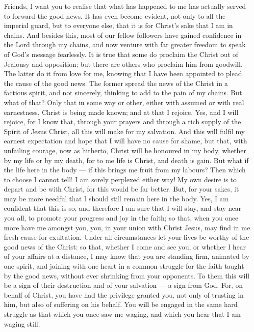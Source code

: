  Friends, I want you to realise that what has happened to
me has actually served to forward the good news.  It has
even become evident, not only to all the imperial guard, but to everyone
else, that it is for Christ's sake that I am in chains. 
And besides this, most of our fellow followers have gained confidence in
the Lord through my chains, and now venture with far greater freedom to
speak of God's message fearlessly.  It is true that some do
proclaim the Christ out of Jealousy and opposition; but there are others
who proclaim him from goodwill.  The latter do it from love
for me, knowing that I have been appointed to plead the cause of the
good news.  The former spread the news of the Christ in a
factious spirit, and not sincerely, thinking to add to the pain of my
chains.  But what of that? Only that in some way or other,
either with assumed or with real earnestness, Christ is being made
known; and at that I rejoice.  Yes, and I will rejoice, for
I know that, through your prayers and through a rich supply of the
Spirit of Jesus Christ, all this will make for my salvation.
 And this will fulfil my earnest expectation and hope that
I will have no cause for shame, but that, with unfailing courage, now as
hitherto, Christ will be honoured in my body, whether by my life or by
my death,  for to me life is Christ, and death is gain.
 But what if the life here in the body --- if this brings
me fruit from my labours? Then which to choose I cannot tell! I am
sorely perplexed either way!  My own desire is to depart
and be with Christ, for this would be far better.  But, for
your sakes, it may be more needful that I should still remain here in
the body.  Yes, I am confident that this is so, and
therefore I am sure that I will stay, and stay near you all, to promote
your progress and joy in the faith;  so that, when you once
more have me amongst you, you, in your union with Christ Jesus, may find
in me fresh cause for exultation.  Under all circumstances
let your lives be worthy of the good news of the Christ: so that,
whether I come and see you, or whether I hear of your affairs at a
distance, I may know that you are standing firm, animated by one spirit,
and joining with one heart in a common struggle for the faith taught by
the good news,  without ever shrinking from your opponents.
To them this will be a sign of their destruction and of your salvation
--- a sign from God.  For, on behalf of Christ, you have
had the privilege granted you, not only of trusting in him, but also of
suffering on his behalf.  You will be engaged in the same
hard struggle as that which you once saw me waging, and which you hear
that I am waging still.

